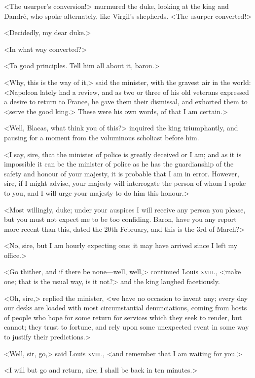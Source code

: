  <The usurper's conversion!> murmured the duke, looking at the king and Dandré, who spoke alternately, like Virgil's shepherds. <The usurper converted!> 

 <Decidedly, my dear duke.> 

 <In what way converted?> 

 <To good principles. Tell him all about it, baron.> 

 <Why, this is the way of it,> said the minister, with the gravest air in the world: <Napoleon lately had a review, and as two or three of his old veterans expressed a desire to return to France, he gave them their dismissal, and exhorted them to <serve the good king.> These were his own words, of that I am certain.> 

 <Well, Blacas, what think you of this?> inquired the king triumphantly, and pausing for a moment from the voluminous scholiast before him. 

 <I say, sire, that the minister of police is greatly deceived or I am; and as it is impossible it can be the minister of police as he has the guardianship of the safety and honour of your majesty, it is probable that I am in error. However, sire, if I might advise, your majesty will interrogate the person of whom I spoke to you, and I will urge your majesty to do him this honour.> 

 <Most willingly, duke; under your auspices I will receive any person you please, but you must not expect me to be too confiding. Baron, have you any report more recent than this, dated the 20th February, and this is the 3rd of March?> 

 <No, sire, but I am hourly expecting one; it may have arrived since I left my office.> 

 <Go thither, and if there be none—well, well,> continued Louis \textsc{xviii.}, <make one; that is the usual way, is it not?> and the king laughed facetiously. 

 <Oh, sire,> replied the minister, <we have no occasion to invent any; every day our desks are loaded with most circumstantial denunciations, coming from hosts of people who hope for some return for services which they seek to render, but cannot; they trust to fortune, and rely upon some unexpected event in some way to justify their predictions.> 

 <Well, sir, go,> said Louis \textsc{xviii.}, <and remember that I am waiting for you.> 

 <I will but go and return, sire; I shall be back in ten minutes.> 

